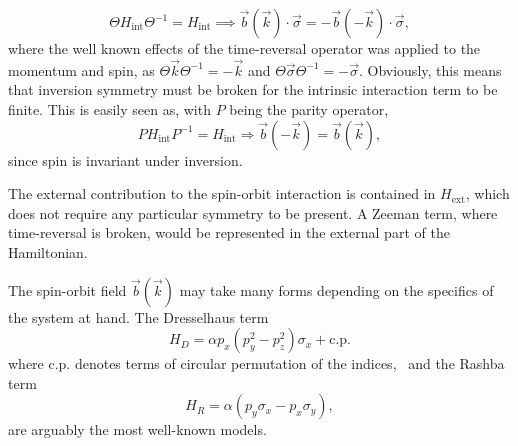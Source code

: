 \begin{equation}
  \Theta H_\text{int} \Theta ^{-1} = H_\text{int}
  \implies 
  \vec{b}(\vec{k}) \cdot \vec{\sigma} = -\vec{b}(-\vec{k}) \cdot \vec{\sigma},
\end{equation}
where the well known effects of the time-reversal operator was applied to the momentum and spin, as $\Theta \vec{k} \Theta ^{-1} = -\vec{k}$ and $\Theta \vec{\sigma} \Theta ^{-1} = -\vec{\sigma}$.
Obviously, this means that inversion symmetry must be broken for the intrinsic interaction term  to be finite.
This is easily seen as, with $P$ being the parity operator,
\begin{equation}
  P H_\text{int} P^{-1} = H_\text{int} \Rightarrow
  \vec{b}(-\vec{k}) = \vec{b}(\vec{k}),
\end{equation}
since spin is invariant under inversion.


The external contribution to the spin-orbit interaction is contained in $H_\text{ext}$, which does not require any particular symmetry to be present.
A Zeeman term, where time-reversal is broken, would be represented in the external part of the Hamiltonian.


The spin-orbit field $\vec{b}(\vec{k})$ may take many forms depending on the specifics of the system at hand.
The Dresselhaus term
\begin{equation}
  H_D = \alpha p_x (p_y^2 - p_z^2) \sigma_x + \text{c.p.}
\end{equation}
where c.p. denotes terms of circular permutation of the indices,~\cite{manchonNewPerspectivesRashba2015} and the Rashba term~\cite{wuTwoDimensionalGiantTunable2020}
\begin{equation}\label{eq:rashba}
  H_R = \alpha (p_y \sigma_x - p_x \sigma_y),
\end{equation}
are arguably the most well-known models.

